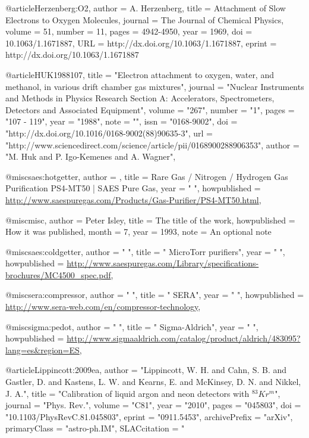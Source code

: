 {{{%

@article{Herzenberg:O2,
author = {A. Herzenberg},
title = {Attachment of Slow Electrons to Oxygen Molecules},
journal = {The Journal of Chemical Physics},
volume = {51},
number = {11},
pages = {4942-4950},
year = {1969},
doi = {10.1063/1.1671887},
URL = {http://dx.doi.org/10.1063/1.1671887},
eprint = {http://dx.doi.org/10.1063/1.1671887}
}

@article{HUK1988107,
title = "Electron attachment to oxygen, water, and methanol, in various drift chamber gas mixtures",
journal = "Nuclear Instruments and Methods in Physics Research Section A: Accelerators, Spectrometers, Detectors and Associated Equipment",
volume = "267",
number = "1",
pages = "107 - 119",
year = "1988",
note = "",
issn = "0168-9002",
doi = "http://dx.doi.org/10.1016/0168-9002(88)90635-3",
url = "http://www.sciencedirect.com/science/article/pii/0168900288906353",
author = "M. Huk and P. Igo-Kemenes and A. Wagner",
}



@misc{saes:hotgetter,
   author = {},
   title = {Rare Gas / Nitrogen / Hydrogen Gas Purification PS4-MT50 | SAES Pure Gas},
   year = " ",
   howpublished = {\url{http://www.saespuregas.com/Products/Gas-Purifier/PS4-MT50.html}},
   }
   
   
@misc{misc,
  author       = {Peter Isley}, 
  title        = {The title of the work},
  howpublished = {How it was published},
  month        = 7,
  year         = 1993,
  note         = {An optional note}
}   
   
@misc{saes:coldgetter,
   author = " ",
   title = " MicroTorr purifiers",
   year = " ",
   howpublished = {\url{http://www.saespuregas.com/Library/specifications-brochures/MC4500_spec.pdf}},
   }

@misc{sera:compressor,
   author = " ",
   title = " SERA",
   year = " ",
   howpublished = {\url{http://www.sera-web.com/en/compressor-technology}},
   }

@misc{sigma:pedot,
   author = " ",
   title = " Sigma-Aldrich",
   year = " ",
   howpublished = {\url{http://www.sigmaaldrich.com/catalog/product/aldrich/483095?lang=es&region=ES}},
   }



@article{Lippincott:2009ea,
      author         = "Lippincott, W. H. and Cahn, S. B. and Gastler, D. and
                        Kastens, L. W. and Kearns, E. and McKinsey, D. N. and
                        Nikkel, J. A.",
      title          = "{Calibration of liquid argon and neon detectors with
                        $^{83}Kr^m$}",
      journal        = "Phys. Rev.",
      volume         = "C81",
      year           = "2010",
      pages          = "045803",
      doi            = "10.1103/PhysRevC.81.045803",
      eprint         = "0911.5453",
      archivePrefix  = "arXiv",
      primaryClass   = "astro-ph.IM",
      SLACcitation   = "%
}


}}}
